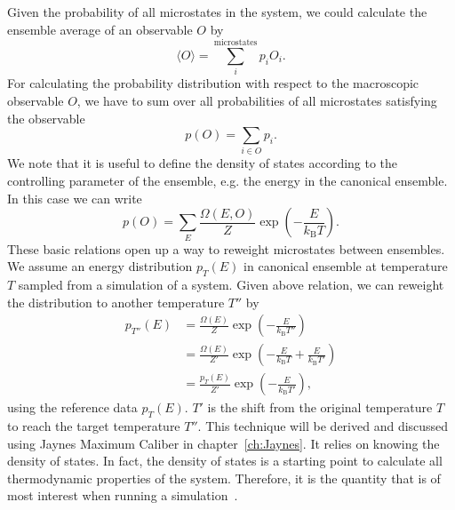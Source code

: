 Given the probability of all microstates in the system, we could calculate the ensemble average of an observable $O$ by
\begin{equation}
\langle O \rangle = \sum_i^{\text{microstates}} p_i O_i .
\end{equation}
For calculating the probability distribution with respect to the macroscopic observable $O$, we have to sum over all probabilities of all microstates satisfying the observable  
\begin{equation}
 p(O) = \sum_{ i \in O } p_i.
\end{equation}
We note that it is useful to define the density of states according to the controlling parameter of the ensemble, e.g. the energy in the canonical ensemble. In this case we can write
\begin{equation}
 p(O) = \sum_E \frac{\Omega(E,O)}{Z} \exp ( -\frac{E}{k_{\textrm{B}} T}).
\end{equation}
These basic relations open up a way to reweight microstates between ensembles. We assume an energy distribution $p_T(E)$ in canonical ensemble at temperature $T$ sampled from a simulation of a system.  Given above relation, we can reweight the distribution to another temperature $T''$ by
\begin{equation}
\begin{aligned}
 p_{T''}(E) &= \frac{ \Omega(E)}{Z} \exp (-\frac{E}{k_{\textrm{B}} T''}) \\
   &=  \frac{\Omega(E)}{Z'} \exp (-\frac{E}{k_{\textrm{B}} T} + \frac{E}{k_{\textrm{B}} T'} )\\
   &= \frac{p_{T}(E)}{Z'}  \exp (-\frac{E}{k_{\textrm{B}} T'}) ,
\end{aligned}
\end{equation}
using the reference data $p_T(E)$. $T'$ is the shift from the original temperature $T$ to reach the target temperature $T''$. This technique will be derived and discussed using Jaynes Maximum Caliber in chapter~\ref{ch:Jaynes}. 
It relies on knowing the density of states. In fact, the density of states is a starting point to calculate all thermodynamic properties of the system. Therefore, it is the quantity that is of most interest when running a simulation~\cite{janke2013monte}. 


